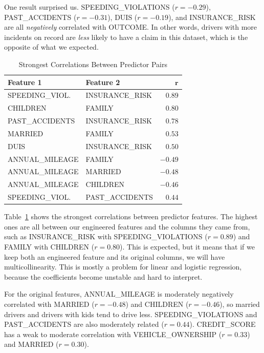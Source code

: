 \documentclass[conference]{IEEEtran}
\begin{document}
One result surprised us. SPEEDING\_VIOLATIONS ($r = -0.29$), PAST\_ACCIDENTS ($r = -0.31$), 
DUIS ($r = -0.19$), and INSURANCE\_RISK are all \emph{negatively} correlated with OUTCOME. 
In other words, drivers with more incidents on record are \emph{less} likely to have a claim in this dataset, which 
is the opposite of what we expected. 

\begin{table}[t]
\caption{Strongest Correlations Between Predictor Pairs}
\label{tab:corr_pairs}
\centering
\setlength{\tabcolsep}{4pt}
\begin{tabular}{@{}llr@{}}
\toprule
\textbf{Feature 1} & \textbf{Feature 2} & $\boldsymbol{r}$ \\
\midrule
SPEEDING\_VIOL.  & INSURANCE\_RISK  & $0.89$ \\
CHILDREN         & FAMILY           & $0.80$ \\
PAST\_ACCIDENTS  & INSURANCE\_RISK  & $0.78$ \\
MARRIED          & FAMILY           & $0.53$ \\
DUIS             & INSURANCE\_RISK  & $0.50$ \\
ANNUAL\_MILEAGE  & FAMILY           & $-0.49$ \\
ANNUAL\_MILEAGE  & MARRIED          & $-0.48$ \\
ANNUAL\_MILEAGE  & CHILDREN         & $-0.46$ \\
SPEEDING\_VIOL.  & PAST\_ACCIDENTS  & $0.44$ \\
\bottomrule
\end{tabular}
\end{table}

Table~\ref{tab:corr_pairs} shows the strongest correlations between predictor features. The highest ones are all 
between our engineered features and the columns they came from, such as INSURANCE\_RISK with 
SPEEDING\_VIOLATIONS ($r = 0.89$) and FAMILY with CHILDREN ($r = 0.80$). This is expected, 
but it means that if we keep both an engineered feature and its original columns, we will have multicollinearity. This 
is mostly a problem for linear and logistic regression, because the coefficients become unstable and hard to interpret. 
 
For the original features, ANNUAL\_MILEAGE is moderately negatively correlated with MARRIED ($r = -0.48$) 
and CHILDREN ($r = -0.46$), so married drivers and drivers with kids tend to drive less. 
SPEEDING\_VIOLATIONS and PAST\_ACCIDENTS are also moderately related ($r = 0.44$). 
CREDIT\_SCORE has a weak to moderate correlation with VEHICLE\_OWNERSHIP ($r = 0.33$) and MARRIED 
($r = 0.30$).
\end{document}
